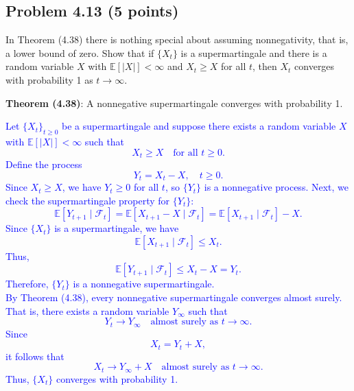 \documentclass{article}
\begin{document}
\subsection*{Problem 4.13 (5 points)}
In Theorem (4.38) there is nothing special about assuming nonnegativity, that is, a lower bound of zero. Show that if $\{X_t\}$ is a supermartingale and there is a random variable $X$ with $\mathbb{E}[|X|] < \infty$ and $X_t \geq X$ for all $t$, then $X_t$ converges with probability 1 as $t \to \infty$.

\textbf{Theorem (4.38)}: A nonnegative supermartingale converges with probability 1.

\textcolor{blue}{Let $\{X_t\}_{t\ge0}$ be a supermartingale and suppose there exists a random variable $X$ with $\mathbb{E}[|X|] < \infty$ such that
\[
X_t \ge X \quad \text{for all } t \ge 0.
\]
Define the process
\[
Y_t = X_t - X, \quad t \ge 0.
\]
Since $X_t \ge X$, we have $Y_t \ge 0$ for all $t$, so $\{Y_t\}$ is a nonnegative process. Next, we check the supermartingale property for $\{Y_t\}$:
\[
\mathbb{E}[Y_{t+1}\mid \mathcal{F}_t] = \mathbb{E}[X_{t+1} - X \mid \mathcal{F}_t] 
= \mathbb{E}[X_{t+1}\mid \mathcal{F}_t] - X.
\]
Since $\{X_t\}$ is a supermartingale, we have
\[
\mathbb{E}[X_{t+1}\mid \mathcal{F}_t] \le X_t.
\]
Thus,
\[
\mathbb{E}[Y_{t+1}\mid \mathcal{F}_t] \le X_t - X = Y_t.
\]
Therefore, $\{Y_t\}$ is a nonnegative supermartingale. \\
By Theorem (4.38), every nonnegative supermartingale converges almost surely. That is, there exists a random variable $Y_\infty$ such that
\[
Y_t \to Y_\infty \quad \text{almost surely as } t \to \infty.
\]
Since
\[
X_t = Y_t + X,
\]
it follows that
\[
X_t \to Y_\infty + X \quad \text{almost surely as } t \to \infty.
\]
Thus, $\{X_t\}$ converges with probability 1.
}

\end{document}
